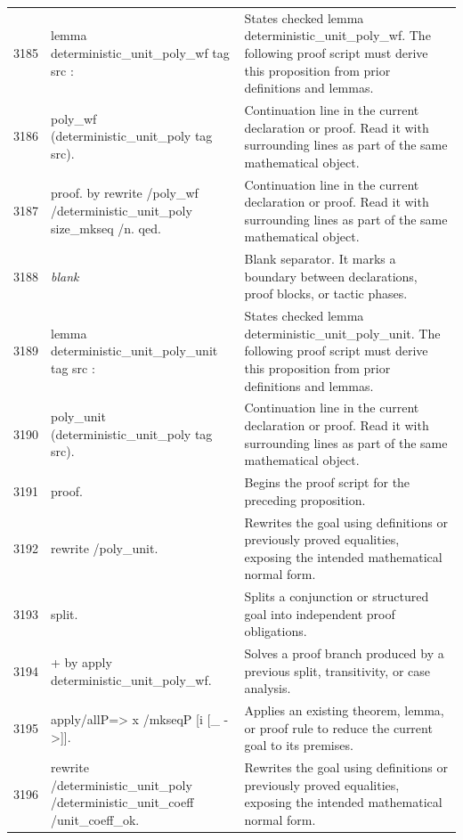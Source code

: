 \documentclass[10pt]{article}
\begin{document}
\begin{longtable}{r L{0.53\textwidth} L{0.37\textwidth}}
3185 & {\ttfamily\scriptsize lemma deterministic\_unit\_poly\_wf tag src :} & States checked lemma deterministic\_unit\_poly\_wf.  The following proof script must derive this proposition from prior definitions and lemmas. \\
3186 & {\ttfamily\scriptsize   poly\_wf (deterministic\_unit\_poly tag src).} & Continuation line in the current declaration or proof.  Read it with surrounding lines as part of the same mathematical object. \\
3187 & {\ttfamily\scriptsize proof. by rewrite /poly\_wf /deterministic\_unit\_poly size\_mkseq /n. qed.} & Continuation line in the current declaration or proof.  Read it with surrounding lines as part of the same mathematical object. \\
3188 & {\ttfamily\scriptsize \emph{blank}} & Blank separator.  It marks a boundary between declarations, proof blocks, or tactic phases. \\
3189 & {\ttfamily\scriptsize lemma deterministic\_unit\_poly\_unit tag src :} & States checked lemma deterministic\_unit\_poly\_unit.  The following proof script must derive this proposition from prior definitions and lemmas. \\
3190 & {\ttfamily\scriptsize   poly\_unit (deterministic\_unit\_poly tag src).} & Continuation line in the current declaration or proof.  Read it with surrounding lines as part of the same mathematical object. \\
3191 & {\ttfamily\scriptsize proof.} & Begins the proof script for the preceding proposition. \\
3192 & {\ttfamily\scriptsize rewrite /poly\_unit.} & Rewrites the goal using definitions or previously proved equalities, exposing the intended mathematical normal form. \\
3193 & {\ttfamily\scriptsize split.} & Splits a conjunction or structured goal into independent proof obligations. \\
3194 & {\ttfamily\scriptsize + by apply deterministic\_unit\_poly\_wf.} & Solves a proof branch produced by a previous split, transitivity, or case analysis. \\
3195 & {\ttfamily\scriptsize apply/allP=> x /mkseqP [i [\_ ->]].} & Applies an existing theorem, lemma, or proof rule to reduce the current goal to its premises. \\
3196 & {\ttfamily\scriptsize rewrite /deterministic\_unit\_poly /deterministic\_unit\_coeff /unit\_coeff\_ok.} & Rewrites the goal using definitions or previously proved equalities, exposing the intended mathematical normal form. \\

\end{longtable}
\end{document}
